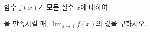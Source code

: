 함수 $f(x)$가 모든 실수 $x$에 대하여 \par\smallskip{}\par\smallskip\noindent 을 만족시킬 때, $\displaystyle\lim_{x\to 1} f(x)$의 값을 구하시오.
